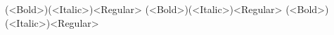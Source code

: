 \documentclass[
	12pt,
	a4paper,
	kosection,
	footnote,
	microtype,
	figtabcapt,
]{oblivoir}
\def\cs#1{\texttt{\textbackslash #1}}
\begin{document}
\begin{boxedverbatim}
\setkormainfont(<Bold>)(<Italic>){<Regular>}
\setkorsansfont(<Bold>)(<Italic>){<Regular>}
\setkormonofont(<Bold>)(<Italic>){<Regular>}
\end{boxedverbatim}
%
%
%
%
%
\end{document}
